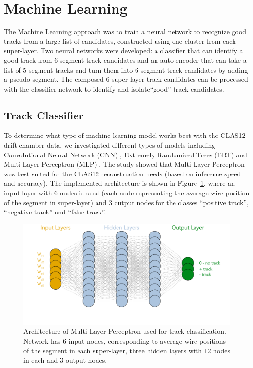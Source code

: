 \section{Machine Learning}

The Machine Learning approach was to train a neural network to recognize good tracks
 from a large list of candidates, constructed using one cluster from each super-layer.
 Two neural networks were developed: a classifier that can identify a good track from  
 6-segment track candidates  and an auto-encoder that can take a list of 5-segment tracks 
 and turn them into 6-segment track candidates by adding a pseudo-segment. The composed 
 6 super-layer track candidates can be processed with the classifier network to identify and 
 isolate``good'' track candidates.


 
 \subsection{Track Classifier}
 
 To determine what type of machine learning model works best with the CLAS12 drift chamber data, 
 we investigated different types of models  \cite{Gavalian:2020oxg} including Convolutional Neural 
 Network (CNN) , Extremely Randomized Trees (ERT) \cite{scikitlearn-extratreesclassifier} and 
 Multi-Layer Perceptron (MLP) \cite{scikitlearn-mlpclassifier}. The study showed that Multi-Layer 
 Perceptron was best suited for the CLAS12 reconstruction needs (based on inference speed and accuracy). 
 The implemented architecture is shown in Figure~\ref{mlp:architecture}, where an input layer with 6 
 nodes is used (each node representing the average wire position of the segment in super-layer) and 3 
 output nodes for the classes ``positive track'', ``negative track'' and ``false track''.
 
 \begin{figure}[!ht]
\begin{center}
  \includegraphics[width=4.5in]{images/mlp_diagram.pdf}
\caption {Architecture of Multi-Layer Perceptron used for track classification. Network has 6 input nodes,
corresponding to average wire positions of the segment in each super-layer, three hidden layers with 12 nodes 
in each and 3 output nodes.}
 \label{mlp:architecture}
 \end{center}
\end{figure}

